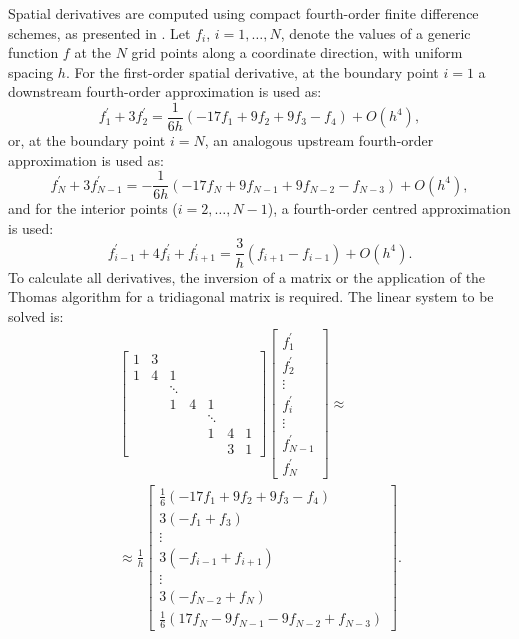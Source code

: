 \documentclass[preprint, 12pt]{elsarticle}
\begin{document}
Spatial derivatives are computed using compact fourth-order finite difference schemes, as presented in \citet{souza2003}. Let $f_i$, $i = 1, \dots, N$, denote the values of a generic function $f$ at the $N$ grid points along a coordinate direction, with uniform spacing $h$. For the first-order spatial derivative, at the boundary point $i=1$ a downstream fourth-order approximation is used as:
\begin{equation}
    f_1^{\prime}+3 f_2^{\prime}=\frac{1}{ 6h}\left(-17f_1 + 9f_2 + 9f_3 - f_4 \right)+O\left(h^4\right),
\end{equation}
or, at the boundary point $i=N$, an analogous upstream fourth-order approximation is used as:
\begin{equation}
    f_N^{\prime} + 3f_{N-1}^{\prime} = -\frac{1}{ 6h}\left(-17f_{N} + 9f_{N-1} + 9f_{N-2} - f_{N-3} \right)+O\left(h^4\right),
\end{equation}
and for the interior points ($i = 2, \dots, N-1$), a fourth-order centred approximation is used:
\begin{equation}
    f_{i-1}^{\prime}+4 f_i^{\prime}+f_{i+1}^{\prime} = \frac{3}{ h}\left(f_{i+1}-f_{i-1}\right) +O\left(h^4\right).
\end{equation}
To calculate all derivatives, the inversion of a matrix or the application of the Thomas algorithm \cite{thomas1949} for a tridiagonal matrix is required. The linear system to be solved is:
\begin{align}
\left[\begin{array}{ccccccc}
    1 & 3 & & & & & \\
    1 & 4 & 1 & & & & \\
    & & \ddots & & & & \\
    & & 1 & 4 & 1 & & \\
    & & & & \ddots & & \\
    & & & & 1 & 4 & 1 \\
    & & & & & 3 & 1
\end{array}\right]\left[\begin{array}{c}
f_1^{\prime} \\
f_2^{\prime} \\
\vdots \\
f_i^{\prime} \\
\vdots \\
f_{N-1}^{\prime} \\
f_N^{\prime}
\end{array}\right]
\approx \nonumber\\ \approx \frac{1}{h}\left[\begin{array}{c}\frac{1}{6}\left(-17f_1 + 9f_2 + 9f_3 - f_4 \right) \\ 3(- f_1 + f_3) \\ \vdots \\ 3\left(-f_{i-1}+f_{i+1}\right) \\ \vdots \\ 3\left(-f_{N-2}+f_{N}\right) \\ \frac{1}{6}\left(17f_N - 9f_{N-1} - 9f_{N-2} + f_{N-3}\right)\end{array}\right].
\end{align}
\end{document}
